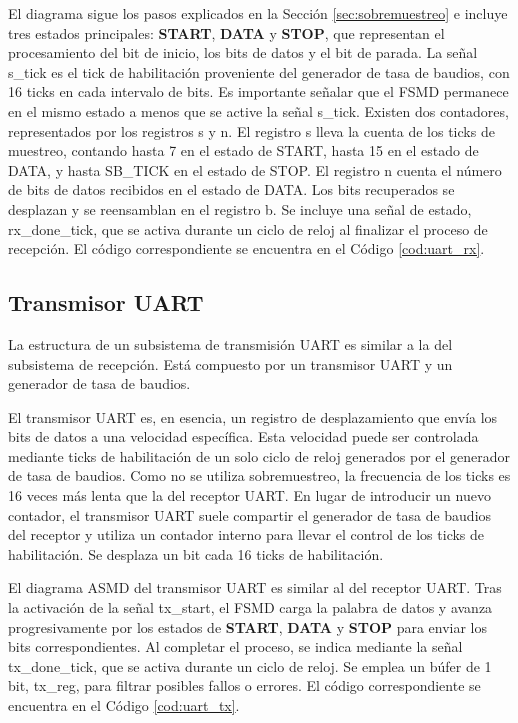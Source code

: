     El diagrama sigue los pasos explicados en la Sección \ref{sec:sobremuestreo} e incluye tres estados principales: \textbf{START}, \textbf{DATA} y \textbf{STOP}, que representan el procesamiento del bit de inicio, los bits de datos y el bit de parada. La señal s\_tick es el tick de habilitación proveniente del generador de tasa de baudios, con 16 ticks en cada intervalo de bits. Es importante señalar que el FSMD permanece en el mismo estado a menos que se active la señal s\_tick. Existen dos contadores, representados por los registros s y n. El registro s lleva la cuenta de los ticks de muestreo, contando hasta 7 en el estado de START, hasta 15 en el estado de DATA, y hasta SB\_TICK en el estado de STOP. El registro n cuenta el número de bits de datos recibidos en el estado de DATA. Los bits recuperados se desplazan y se reensamblan en el registro b. Se incluye una señal de estado, rx\_done\_tick, que se activa durante un ciclo de reloj al finalizar el proceso de recepción. El código correspondiente se encuentra en el Código \ref{cod:uart_rx}.

    \subsection{Transmisor UART}
    
    La estructura de un subsistema de transmisión UART es similar a la del subsistema de recepción. Está compuesto por un transmisor UART y un generador de tasa de baudios.
    
    El transmisor UART es, en esencia, un registro de desplazamiento que envía los bits de datos a una velocidad específica. Esta velocidad puede ser controlada mediante ticks de habilitación de un solo ciclo de reloj generados por el generador de tasa de baudios. Como no se utiliza sobremuestreo, la frecuencia de los ticks es 16 veces más lenta que la del receptor UART. En lugar de introducir un nuevo contador, el transmisor UART suele compartir el generador de tasa de baudios del receptor y utiliza un contador interno para llevar el control de los ticks de habilitación. Se desplaza un bit cada 16 ticks de habilitación.
    
    El diagrama ASMD del transmisor UART es similar al del receptor UART. Tras la activación de la señal tx\_start, el FSMD carga la palabra de datos y avanza progresivamente por los estados de \textbf{START}, \textbf{DATA} y \textbf{STOP} para enviar los bits correspondientes. Al completar el proceso, se indica mediante la señal tx\_done\_tick, que se activa durante un ciclo de reloj. Se emplea un búfer de 1 bit, tx\_reg, para filtrar posibles fallos o errores. El código correspondiente se encuentra en el Código \ref{cod:uart_tx}.

